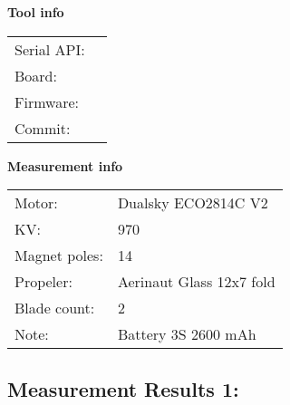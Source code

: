 \documentclass[10pt]{article}
\begin{document}
\noindent
{\large \bf Tool info}
\vspace{3mm}

\noindent
\begin{tabular}{ll}
Serial API:  & \\ 
Board:       & \\ 
Firmware:    & \\ 
Commit:      & 
\end{tabular}
\vspace{3mm}

\noindent
{\large \bf Measurement info}
\vspace{3mm}

\noindent
\begin{tabular}{ll}
Motor:        & Dualsky ECO2814C V2\\ 
KV:           & 970\\ 
Magnet poles: & 14\\ 
Propeler:     & Aerinaut Glass 12x7 fold\\ 
Blade count:  & 2\\ 
Note:         & Battery 3S 2600 mAh
\end{tabular}

\vspace{3mm}


\subsection*{\large \bf Measurement Results 1:}
\end{document}
